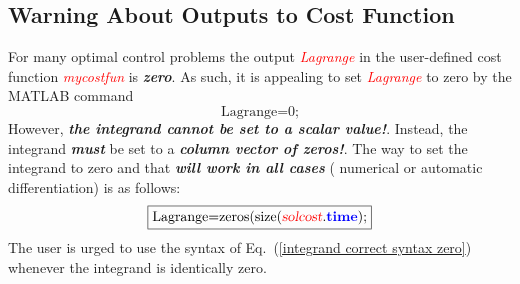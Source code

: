 \documentclass[10pt,final]{report}
\newcommand{\bfblue}[1]{\textcolor{blue}{\bf #1}}
\newcommand{\slred}[1]{\textcolor{red}{\sl #1}}
\begin{document}
\subsection{Warning About Outputs to Cost Function}

For many optimal control problems the output \slred{Lagrange} in the
user-defined cost function \slred{mycostfun} is {\bf\em zero}.  As such, it is
appealing to set \slred{Lagrange} to zero by the MATLAB command
\begin{equation}
  \textrm{Lagrange=0;}
\end{equation}
However, {\bf\em the integrand cannot be set to a scalar value!}.  Instead,
the integrand {\bf\em must} be set to a {\bf\em column vector of zeros!}.  The
way to set the integrand to zero and that {\bf\em will work in all cases} (\ie
numerical or automatic differentiation) is as follows:
\begin{equation}\label{integrand correct syntax zero}
  \boxed{
    \textrm{Lagrange=zeros(size(\slred{solcost}.\bfblue{time});}
  }
\end{equation}
The user is urged to use the syntax of Eq.~(\ref{integrand correct syntax zero})
whenever the integrand is identically zero.
\end{document}

